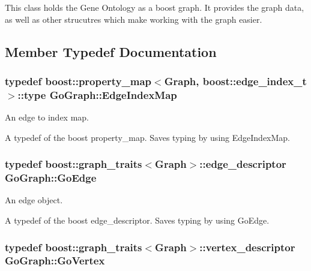 This class holds the Gene Ontology as a boost graph. It provides the graph data, as well as other strucutres which make working with the graph easier. 

\subsection{Member Typedef Documentation}
\subsubsection[{\texorpdfstring{Edge\+Index\+Map}{EdgeIndexMap}}]{\setlength{\rightskip}{0pt plus 5cm}typedef boost\+::property\+\_\+map$<${\bf Graph}, boost\+::edge\+\_\+index\+\_\+t $>$\+::type {\bf Go\+Graph\+::\+Edge\+Index\+Map}}\hypertarget{classGoGraph_a1fd5f6b3ef1f58a665bbc8e317be9817}{}\label{classGoGraph_a1fd5f6b3ef1f58a665bbc8e317be9817}


An edge to index map. 

A typedef of the boost property\+\_\+map. Saves typing by using Edge\+Index\+Map. 
\subsubsection[{\texorpdfstring{Go\+Edge}{GoEdge}}]{\setlength{\rightskip}{0pt plus 5cm}typedef boost\+::graph\+\_\+traits$<${\bf Graph}$>$\+::edge\+\_\+descriptor {\bf Go\+Graph\+::\+Go\+Edge}}\hypertarget{classGoGraph_a6a06a7cf401fba8f03f8f68b54744a75}{}\label{classGoGraph_a6a06a7cf401fba8f03f8f68b54744a75}


An edge object. 

A typedef of the boost edge\+\_\+descriptor. Saves typing by using Go\+Edge. 
\subsubsection[{\texorpdfstring{Go\+Vertex}{GoVertex}}]{\setlength{\rightskip}{0pt plus 5cm}typedef boost\+::graph\+\_\+traits$<${\bf Graph}$>$\+::vertex\+\_\+descriptor {\bf Go\+Graph\+::\+Go\+Vertex}}\hypertarget{classGoGraph_afabec0fb17c98de989e7dd9f3a54e650}{}\label{classGoGraph_afabec0fb17c98de989e7dd9f3a54e650}


